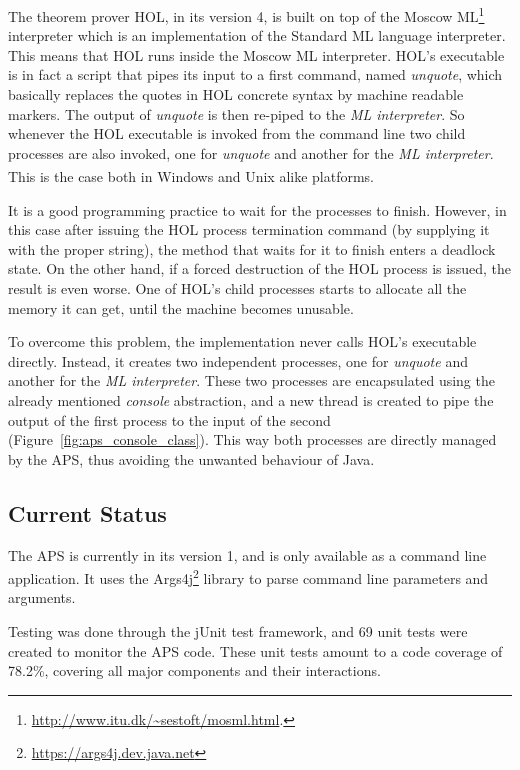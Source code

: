 \documentclass[]{article}
\begin{document}
The theorem prover HOL, in its version 4, is built on top of the Moscow ML\footnote{\url{http://www.itu.dk/~sestoft/mosml.html}.} interpreter which is an implementation of the Standard ML language interpreter.
This means that HOL runs inside the Moscow ML interpreter.
HOL's executable is in fact a script that pipes its input to a first command, named \emph{unquote}, which basically replaces the quotes in HOL concrete syntax by machine readable markers.
The output of \emph{unquote} is then re-piped to the \emph{ML interpreter}.
So whenever the HOL executable is invoked from the command line two child processes are also invoked, one for \emph{unquote} and another for the \emph{ML interpreter}.
This is the case both in Windows\textsuperscript{\texttrademark} and Unix\textsuperscript{\texttrademark} alike platforms.

It is a good programming practice to wait for the processes to finish.
However, in this case after issuing the HOL process termination command (by supplying it with the proper string), the method that waits for it to finish enters a deadlock state.
On the other hand, if a forced destruction of the HOL process is issued, the result is even worse.
One of HOL's child processes starts to allocate all the memory it can get, until the machine becomes unusable.

To overcome this problem, the implementation never calls HOL's executable directly.
Instead, it creates two independent processes, one for \emph{unquote} and another for the \emph{ML interpreter}.
These two processes are encapsulated using the already mentioned \emph{console} abstraction, and a new thread is created to pipe the output of the first process to the input of the second (Figure~\ref{fig:aps_console_class}).
This way both processes are directly managed by the APS, thus avoiding the unwanted behaviour of Java.

\subsection{Current Status}

The APS is currently in its version 1, and is only available as a command line application.
It uses the Args4j\footnote{\url{https://args4j.dev.java.net}} library to parse command line parameters and arguments.

Testing was done through the jUnit test framework, and 69 unit tests were created to monitor the APS code.
These unit tests amount to a code coverage of 78.2\%, covering all major components and their interactions.
\end{document}
